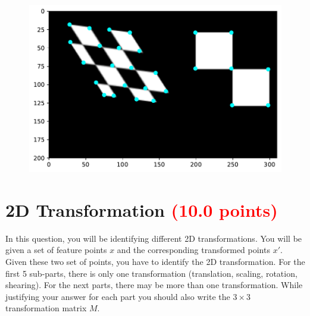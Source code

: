 \documentclass[answers]{exam}
\newcommand{\mypoints}[1]{\textcolor{red}{(#1 points)}}
\begin{document}
\begin{solution}
\begin{figure}[H]
    \centering
    \includegraphics[width=\linewidth]{Images/question_3_10.pdf}
\end{figure}
\end{solution}

\newpage
\section{2D Transformation \mypoints{10.0}}
In this question, you will be identifying different 2D transformations. You will be given a set of feature points $x$ and the corresponding transformed points $x'$. Given these two set of points, you have to identify the 2D transformation. For the first 5 sub-parts, there is only one transformation (translation, scaling, rotation, shearing). For the next parts, there may be more than one transformation.
While justifying your answer for each part you should also write the $3 \times 3$ transformation matrix $M$.
\end{document}
